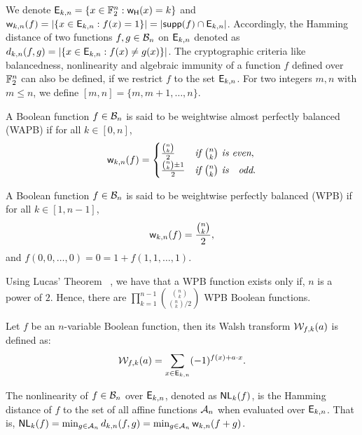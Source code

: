 \documentclass{llncs}
\begin{document}
We denote $\mathsf{E}_{k,n} = \{x \in \mathbb{F}_2^n : \mathsf{w_H}(x)=k\}$ and $\mathsf{w}_{k,n}(f) = |\{x \in \mathsf{E}_{k,n} : f(x) = 1 \}| = |\mathsf{supp}(f) \cap \mathsf{E}_{k,n}|$. Accordingly, the Hamming distance of two functions $f, g \in \mathcal{B}_n$ on $\mathsf{E}_{k,n}$ denoted as $d_{k,n}(f,g) = |\{x \in \mathsf{E}_{k,n} : f(x) \neq g(x)\}|$. The cryptographic criteria like balancedness, nonlinearity and algebraic immunity of a function $f$ defined over $\mathbb{F}_2^n$ can also be defined, if we restrict $f$ to the set $\mathsf{E}_{k,n}$. For two integers $m, n$ with $m \leq n$, we define $[m,n] = \{m, m+1, \ldots, n\}$.

\begin{definition}\label{def:WAPB}
A Boolean function $f \in \mathcal{B}_n$ is said to be weightwise almost perfectly balanced (WAPB) if for all $k \in [0,n]$, \[\mathsf{w}_{k,n}(f)=
\begin{cases}
\frac{{n\choose k}}{2} & \textit{if } {n \choose k} \textit{ is even},\\
\frac{{n \choose k}\pm 1}{2} & \textit{if } {n \choose k} \textit{ is \; odd}.
\end{cases} \]
\end{definition}

\begin{definition}\label{def:WPB}
A Boolean function $f \in \mathcal{B}_n$ is said to be weightwise perfectly balanced (WPB) if for all $k \in [1,n-1]$, 
\[\mathsf{w}_{k,n}(f) = \frac{{n \choose k}}{2},\]
and $f(0,0,\ldots,0)=0=1+f(1,1,\ldots,1)$.
\end{definition}

Using Lucas' Theorem \eg~\cite{AMM:F47}, we have that a WPB function exists only if, $n$ is a power of $2$. Hence, there are $\displaystyle {\prod_{k = 1}^{n-1} {{{n \choose k}} \choose {{n \choose k}/2}}}$ WPB Boolean functions.

\begin{definition}\label{def:restWalsh}
Let $f$ be an $n$-variable Boolean function, then its Walsh transform $\mathcal{W}_{f,k}(a)$ is defined as:
\[\mathcal{W}_{f,k}(a) = \sum_{x \in \mathsf{E}_{k,n}} (-1)^{f(x)+ a \cdot x}.\]
\end{definition}

\begin{definition}\label{def:wtNl}
The nonlinearity of $f \in \mathcal{B}_n$ over $\mathsf{E}_{k,n}$, denoted as $\mathsf{NL}_{k}(f)$, is the Hamming distance of $f$ to the set of all affine functions $\mathcal{A}_n$ when evaluated over $\mathsf{E}_{k,n}$. 
That is, $\mathsf{NL}_{k}(f) = \min_{g \in \mathcal{A}_n} d_{k,n}(f,g) = \min_{g \in \mathcal{A}_n} \mathsf{w}_{k,n}(f+g)$.\\
\end{definition}
\end{document}
